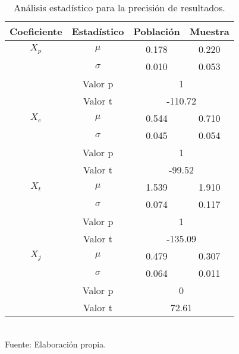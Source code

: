 \documentclass[12pt]{article} %
\begin{document}
\begin{table}[H]
    \caption{Análisis estadístico para la precisión de resultados.}
    \vspace{0.2cm}
    \centering
    \begin{tabular}{|c|c|c|c|}
    \hline
    \textbf{Coeficiente} & \textbf{Estadístico} & \textbf{Población} & \textbf{Muestra} \\ \hline
    $X_p$ & \multicolumn{1}{|c|}{\(\mu\)} & 0.178 & 0.220 \\ \cline{2-4}
    & \multicolumn{1}{|c|}{\(\sigma\)} & 0.010 & 0.053 \\ \cline{2-4}
    & \multicolumn{1}{|c|}{Valor p} & \multicolumn{2}{|c|}{1} \\ \cline{2-4}
    & \multicolumn{1}{|c|}{Valor t} & \multicolumn{2}{|c|}{-110.72} \\ \hline
    
    $X_e$ & \multicolumn{1}{|c|}{\(\mu\)} & 0.544 & 0.710 \\ \cline{2-4}
    & \multicolumn{1}{|c|}{\(\sigma\)} & 0.045 & 0.054 \\ \cline{2-4}
    & \multicolumn{1}{|c|}{Valor p} & \multicolumn{2}{|c|}{1} \\ \cline{2-4}
    & \multicolumn{1}{|c|}{Valor t} & \multicolumn{2}{|c|}{-99.52} \\ \hline
    
    $X_t$ & \multicolumn{1}{|c|}{\(\mu\)} & 1.539 & 1.910 \\ \cline{2-4}
    & \multicolumn{1}{|c|}{\(\sigma\)} & 0.074 & 0.117 \\ \cline{2-4}
    & \multicolumn{1}{|c|}{Valor p} & \multicolumn{2}{|c|}{1} \\ \cline{2-4}
    & \multicolumn{1}{|c|}{Valor t} & \multicolumn{2}{|c|}{-135.09} \\ \hline
    
    $X_j$ & \multicolumn{1}{|c|}{\(\mu\)} & 0.479 & 0.307 \\ \cline{2-4}
    & \multicolumn{1}{|c|}{\(\sigma\)} & 0.064 & 0.011 \\ \cline{2-4}
    & \multicolumn{1}{|c|}{Valor p} & \multicolumn{2}{|c|}{0} \\ \cline{2-4}
    & \multicolumn{1}{|c|}{Valor t} & \multicolumn{2}{|c|}{72.61} \\ \hline
    \end{tabular}
    \\Fuente: Elaboración propia.
\end{table}
\end{document}
